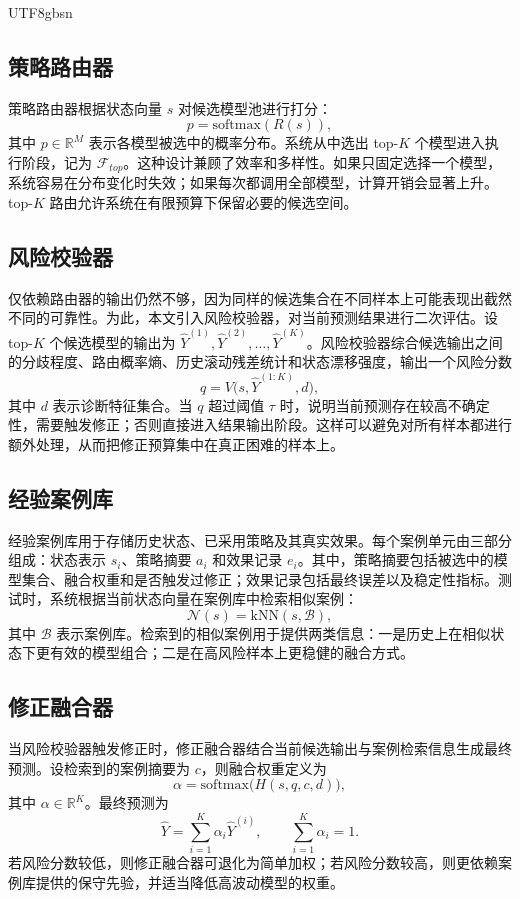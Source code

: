 \documentclass[journal,twoside,web]{ieeecolor}
\begin{document}
\begin{CJK*}{UTF8}{gbsn}
\subsection{策略路由器}
策略路由器根据状态向量 $s$ 对候选模型池进行打分：
\begin{equation}
p = \mathrm{softmax}(R(s)),
\label{eq:router}
\end{equation}
其中 $p\in\mathbb{R}^{M}$ 表示各模型被选中的概率分布。系统从中选出 top-$K$ 个模型进入执行阶段，记为 $\mathcal{F}_{top}$。这种设计兼顾了效率和多样性。如果只固定选择一个模型，系统容易在分布变化时失效；如果每次都调用全部模型，计算开销会显著上升。top-$K$ 路由允许系统在有限预算下保留必要的候选空间。

\subsection{风险校验器}
仅依赖路由器的输出仍然不够，因为同样的候选集合在不同样本上可能表现出截然不同的可靠性。为此，本文引入风险校验器，对当前预测结果进行二次评估。设 top-$K$ 个候选模型的输出为 $\hat{Y}^{(1)},\hat{Y}^{(2)},\ldots,\hat{Y}^{(K)}$。风险校验器综合候选输出之间的分歧程度、路由概率熵、历史滚动残差统计和状态漂移强度，输出一个风险分数
\begin{equation}
q = V\bigl(s,\hat{Y}^{(1:K)},d\bigr),
\label{eq:risk}
\end{equation}
其中 $d$ 表示诊断特征集合。当 $q$ 超过阈值 $\tau$ 时，说明当前预测存在较高不确定性，需要触发修正；否则直接进入结果输出阶段。这样可以避免对所有样本都进行额外处理，从而把修正预算集中在真正困难的样本上。

\subsection{经验案例库}
经验案例库用于存储历史状态、已采用策略及其真实效果。每个案例单元由三部分组成：状态表示 $s_i$、策略摘要 $a_i$ 和效果记录 $e_i$。其中，策略摘要包括被选中的模型集合、融合权重和是否触发过修正；效果记录包括最终误差以及稳定性指标。测试时，系统根据当前状态向量在案例库中检索相似案例：
\begin{equation}
\mathcal{N}(s)=\mathrm{kNN}(s,\mathcal{B}),
\label{eq:memory}
\end{equation}
其中 $\mathcal{B}$ 表示案例库。检索到的相似案例用于提供两类信息：一是历史上在相似状态下更有效的模型组合；二是在高风险样本上更稳健的融合方式。

\subsection{修正融合器}
当风险校验器触发修正时，修正融合器结合当前候选输出与案例检索信息生成最终预测。设检索到的案例摘要为 $c$，则融合权重定义为
\begin{equation}
\alpha = \mathrm{softmax}\bigl(H(s,q,c,d)\bigr),
\label{eq:fusion}
\end{equation}
其中 $\alpha\in\mathbb{R}^{K}$。最终预测为
\begin{equation}
\hat{Y}=\sum_{i=1}^{K}\alpha_i\hat{Y}^{(i)}, \qquad \sum_{i=1}^{K}\alpha_i=1.
\label{eq:final}
\end{equation}
若风险分数较低，则修正融合器可退化为简单加权；若风险分数较高，则更依赖案例库提供的保守先验，并适当降低高波动模型的权重。


\end{CJK*}
\end{document}
